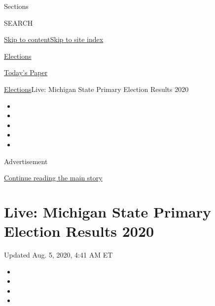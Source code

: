 Sections

SEARCH

\protect\hyperlink{site-content}{Skip to
content}\protect\hyperlink{site-index}{Skip to site index}

\href{https://www.nytimes3xbfgragh.onion/news-event/2020-election}{Elections}

\href{https://myaccount.nytimes3xbfgragh.onion/auth/login?response_type=cookie\&client_id=vi}{}

\href{https://www.nytimes3xbfgragh.onion/section/todayspaper}{Today's
Paper}

\href{/news-event/2020-election}{Elections}\textbar{}Live: Michigan
State Primary Election Results 2020

\begin{itemize}
\item
\item
\item
\item
\item
\end{itemize}

Advertisement

\protect\hyperlink{after-top}{Continue reading the main story}

\hypertarget{live-michigan-state-primary-election-results-2020}{%
\section{Live: Michigan State Primary Election Results
2020}\label{live-michigan-state-primary-election-results-2020}}

Updated Aug. 5, 2020, 4:41 AM ET

\begin{itemize}
\item
\item
\item
\item
\end{itemize}

